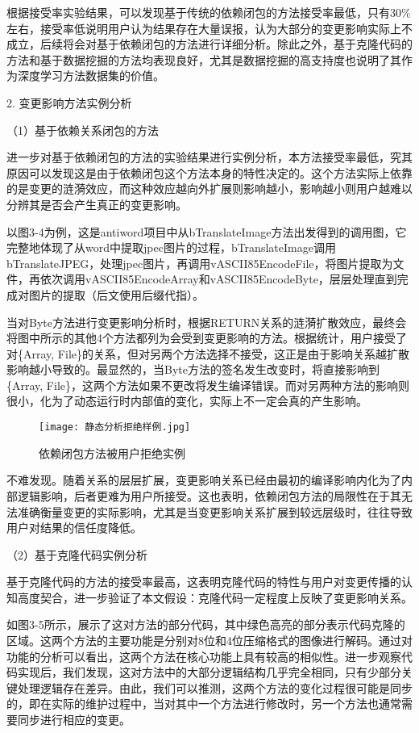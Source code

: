 根据接受率实验结果，可以发现基于传统的依赖闭包的方法接受率最低，只有30\%左右，接受率低说明用户认为结果存在大量误报，认为大部分的变更影响实际上不成立，后续将会对基于依赖闭包的方法进行详细分析。除此之外，基于克隆代码的方法和基于数据挖掘的方法均表现良好，尤其是数据挖掘的高支持度也说明了其作为深度学习方法数据集的价值。

2. 变更影响方法实例分析

（1）基于依赖关系闭包的方法

进一步对基于依赖闭包的方法的实验结果进行实例分析，本方法接受率最低，究其原因可以发现这是由于依赖闭包这个方法本身的特性决定的。这个方法实际上依靠的是变更的涟漪效应，而这种效应越向外扩展则影响越小，影响越小则用户越难以分辨其是否会产生真正的变更影响。

以图3-4为例，这是antiword项目中从bTranslateImage方法出发得到的调用图，它完整地体现了从word中提取jpec图片的过程，bTranslateImage调用bTranslateJPEG，处理jpec图片，再调用vASCII85EncodeFile，将图片提取为文件，再依次调用vASCII85EncodeArray和vASCII85EncodeByte，层层处理直到完成对图片的提取（后文使用后缀代指）。

当对Byte方法进行变更影响分析时，根据RETURN关系的涟漪扩散效应，最终会将图中所示的其他4个方法都列为会受到变更影响的方法。根据统计，用户接受了对\{Array, File\}的关系，但对另两个方法选择不接受，这正是由于影响关系越扩散影响越小导致的。最显然的，当Byte方法的签名发生改变时，将直接影响到\{Array, File\}，这两个方法如果不更改将发生编译错误。而对另两种方法的影响则很小，化为了动态运行时内部值的变化，实际上不一定会真的产生影响。

\begin{figure}[h]
\centering
\texttt{[image: 静态分析拒绝样例.jpg]}
\caption{依赖闭包方法被用户拒绝实例}
\end{figure}

不难发现。随着关系的层层扩展，变更影响关系已经由最初的编译影响内化为了内部逻辑影响，后者更难为用户所接受。这也表明，依赖闭包方法的局限性在于其无法准确衡量变更的实际影响，尤其是当变更影响关系扩展到较远层级时，往往导致用户对结果的信任度降低。



（2）基于克隆代码实例分析

基于克隆代码的方法的接受率最高，这表明克隆代码的特性与用户对变更传播的认知高度契合，进一步验证了本文假设：克隆代码一定程度上反映了变更影响关系。

如图3-5所示，展示了这对方法的部分代码，其中绿色高亮的部分表示代码克隆的区域。这两个方法的主要功能是分别对8位和4位压缩格式的图像进行解码。通过对功能的分析可以看出，这两个方法在核心功能上具有较高的相似性。进一步观察代码实现后，我们发现，这对方法中的大部分逻辑结构几乎完全相同，只有少部分关键处理逻辑存在差异。由此，我们可以推测，这两个方法的变化过程很可能是同步的，即在实际的维护过程中，当对其中一个方法进行修改时，另一个方法也通常需要同步进行相应的变更。


